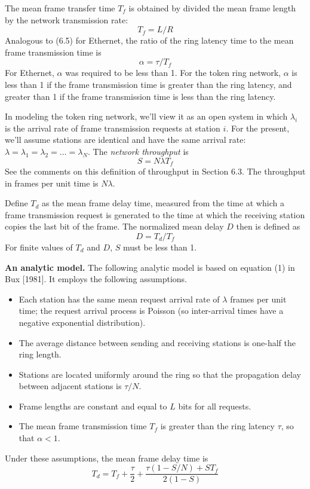 The mean frame transfer time $T_f$ is obtained by divided the mean frame length by the network transmission rate:
\begin{equation} T_f=L/R \end{equation}
Analogous to (6.5) for Ethernet, the ratio of the ring latency time to the mean frame transmission time is
\begin{equation} \alpha=\tau/T_f \end{equation}
For Ethernet, $\alpha$ was required to be less than 1. For the token ring network, $\alpha$ is less than 1 if the frame transmission time is greater than the ring latency, and greater than 1 if the frame transmission time is less than the ring latency.

In modeling the token ring network, we'll view it as an open system in which $\lambda_i$ is the arrival rate of frame transmission requests at station $i$. For the present, we'll assume stations are identical and have the same arrival rate: $\lambda=\lambda_1=\lambda_2=\ldots=\lambda_N$. The \emph{network throughput} is
\begin{equation} S=N\lambda T_f \end{equation}
See the comments on this definition of throughput in Section 6.3. The throughput in frames per unit time is $N\lambda$.

Define $T_d$ as the mean frame delay time, measured from the time at which a frame transmission request is generated to the time at which the receiving station copies the last bit of the frame. The normalized mean delay $D$ then is defined as
\begin{equation} D=T_d/T_f \end{equation}
For finite values of $T_d$ and $D$, $S$ must be less than 1.

\noindent\textbf{An analytic model.} The following analytic model is based on equation (1) in Bux [1981]. It employs the following assumptions.


\begin{itemize}
\item Each station has the same mean request arrival rate of $\lambda$ frames per unit time; the request arrival process is Poisson (so inter-arrival times have a negative exponential distribution).
\item The average distance between sending and receiving stations is one-half the ring length.
\item Stations are located uniformly around the ring so that the propagation delay between adjacent stations is $\tau/N$.
\item Frame lengths are constant and equal to $L$ bits for all requests.
\item The mean frame transmission time $T_f$ is greater than the ring latency $\tau$, so that $\alpha<1$.
\end{itemize}
Under these assumptions, the mean frame delay time is
\begin{equation} T_d=T_f+\frac{\tau}{2}+\frac{\tau(1-S/N)+ST_f}{2(1-S)} \end{equation}

